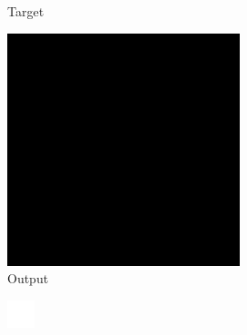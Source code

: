 \begin{figure}
\begin{subfigure}{.19\textwidth}
		\caption{Target}
	\end{subfigure}
	\begin{subfigure}{.19\textwidth}
		\centering
		\includegraphics[width=.9\linewidth]{img/results/initial_output}
		\caption{Output}
	\end{subfigure}
	\begin{subfigure}{.19\textwidth}
		\centering
		\includegraphics[width=.9\linewidth,interpolate=false]{img/results/initial_real}

\end{subfigure}
\end{figure}
